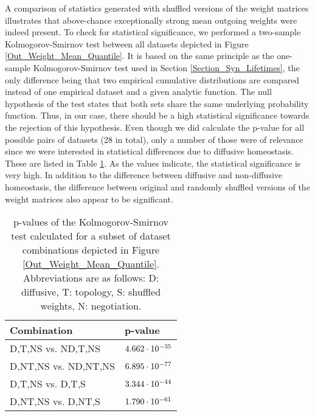 \documentclass[10pt,a4paper]{article}
\begin{document}
A comparison of statistics generated with shuffled versions of the weight matrices illustrates that above-chance exceptionally strong mean outgoing weights were indeed present. To check for statistical significance, we performed a two-sample Kolmogorov-Smirnov test between all datasets depicted in Figure \ref{Out_Weight_Mean_Quantile}. It is based on the same principle as the one-sample Kolmogorov-Smirnov test used in Section \ref{Section_Syn_Lifetimes}, the only difference being that two empirical cumulative distributions are compared instead of one empirical dataset and a given analytic function. The null hypothesis of the test states that both sets share the same underlying probability function. Thus, in our case, there should be a high statistical significance towards the rejection of this hypothesis. Even though we did calculate the p-value for all possible pairs of datasets (28 in total), only a number of those were of relevance since we were interested in statistical differences due to diffusive homeostasis. These are listed in Table \ref{Kolmogorov_Mean_Out}. As the values indicate, the statistical significance is very high. In addition to the difference between diffusive and non-diffusive homeostasis, the difference between original and randomly shuffled versions of the weight matrices also appear to be significant. 

\begin{table}
\caption[p-values of the Kolmogorov-Smirnov test calculated for a subset of dataset combinations depicted in Figure \ref{Out_Weight_Mean_Quantile}]{p-values of the Kolmogorov-Smirnov test calculated for a subset of dataset combinations depicted in Figure \ref{Out_Weight_Mean_Quantile}. Abbreviations are as follows: D: diffusive, T: topology, S: shuffled weights, N: negotiation.}
\begin{center}
\begin{tabu}{|l|l|}
\hline
\textbf{Combination} & \textbf{p-value} \\ \hline
D,T,NS vs. ND,T,NS & $\rm 4.662 \cdot 10^{-35}$ \\ \hline
D,NT,NS vs. ND,NT,NS & $\rm 6.895 \cdot 10^{-77}$ \\ \hline
D,T,NS vs. D,T,S & $\rm 3.344 \cdot 10^{-44}$ \\ \hline
D,NT,NS vs. D,NT,S & $\rm 1.790 \cdot 10^{-61}$ \\ \hline
\end{tabu}
\end{center}
\label{Kolmogorov_Mean_Out}
\end{table}
\end{document}
